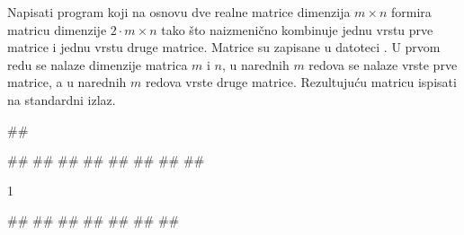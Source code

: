 \begin{Exercise}[label=342]
Napisati program koji na osnovu dve realne matrice dimenzija $m \times n$
formira matricu dimenzije $2 \cdot m \times n$ tako što
naizmenično kombinuje jednu vrstu prve matrice i jednu vrstu
druge matrice. Matrice su zapisane u datoteci . U
prvom redu se nalaze dimenzije matrica $m$ i $n$, u
narednih $m$ redova se nalaze vrste prve matrice, a u
narednih $m$ redova vrste druge matrice. Rezultujuću
matricu ispisati na standardni izlaz.


\begin{miditest}
\begin{upotreba}{1}
##

##
##
##
##
##
##
##
##
\end{upotreba}
\end{miditest}
\begin{miditest}
\begin{test2}{1}



#\naslovInt#
##
##
##
##
##
##
\end{test2}
\end{miditest}
\end{Exercise}

